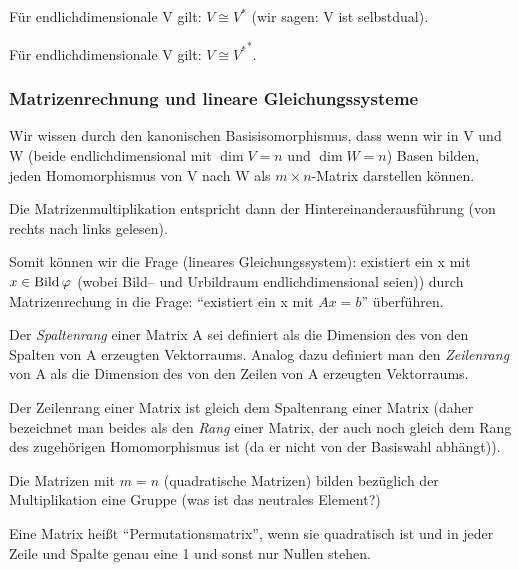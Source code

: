 \documentclass[10pt]{scrbook}
\begin{document}
\begin{Le}
Für endlichdimensionale V gilt:
$V\cong V^*$ (wir sagen: V ist selbstdual).
\end{Le}

\begin{Kor}
Für endlichdimensionale V gilt: $V \cong {V^*}^*$.
\end{Kor}

\subsubsection{Matrizenrechnung und lineare Gleichungssysteme}

Wir wissen durch den kanonischen Basisisomorphismus, dass wenn wir in V und W (beide endlichdimensional mit $\dim V=n$ und $\dim W=n$) Basen bilden, jeden Homomorphismus von V nach W als $m \times n$-Matrix darstellen können.

Die Matrizenmultiplikation entspricht dann der Hintereinanderausführung (von rechts nach links gelesen).

Somit können wir die Frage (lineares Gleichungssystem): existiert ein x mit $x\in\operatorname{Bild} \varphi$ (wobei Bild-- und Urbildraum endlichdimensional seien)) durch Matrizenrechung in die Frage: "`existiert ein x mit $A x=b$"' überführen.

\begin{Def}
Der \emph{Spaltenrang} einer Matrix A sei definiert als die Dimension des von den Spalten von A erzeugten Vektorraums. Analog dazu definiert man den \emph{Zeilenrang} von A als die Dimension des von den Zeilen von A erzeugten Vektorraums.
\end{Def}

\begin{Sa}
Der Zeilenrang einer Matrix ist gleich dem Spaltenrang einer Matrix (daher bezeichnet man beides als den \emph{Rang} einer Matrix, der auch noch gleich dem Rang des zugehörigen Homomorphismus ist (da er nicht von der Basiswahl abhängt)).
\end{Sa}

\begin{Sa}
Die Matrizen mit $m=n$ (quadratische Matrizen) bilden bezüglich der Multiplikation eine Gruppe (was ist das neutrales Element?)
\end{Sa}

\begin{Def}
Eine Matrix heißt "`Permutationsmatrix"', wenn sie quadratisch ist und in jeder Zeile und Spalte genau eine 1 und sonst nur Nullen stehen.
\end{Def}
\end{document}
